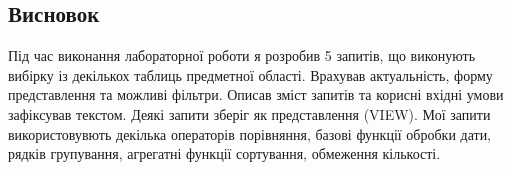 \documentclass[14pt]{extreport}
\begin{document}
\begin{normalsize}
	\section*{Висновок}
	Під час виконання лабораторної роботи я розробив 5 запитів, що виконують вибірку із декількох таблиць предметної області. Врахував актуальність, форму представлення та можливі фільтри. Описав зміст запитів та корисні вхідні умови зафіксував текстом. Деякі запити зберіг як представлення (VIEW).
	Мої запити використовувють декілька операторів порівняння, базові функції обробки дати, рядків групування, агрегатні функції сортування, обмеження кількості.
	 
\end{normalsize}
\end{document}

